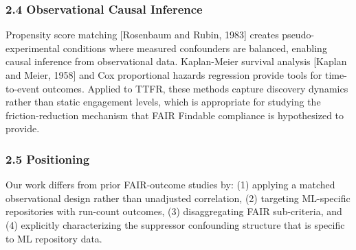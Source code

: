 \subsubsection{2.4 Observational Causal Inference}

Propensity score matching [Rosenbaum and Rubin, 1983] creates pseudo-experimental conditions where measured confounders are balanced, enabling causal inference from observational data. Kaplan-Meier survival analysis [Kaplan and Meier, 1958] and Cox proportional hazards regression \citep{Cox1972} provide tools for time-to-event outcomes. Applied to TTFR, these methods capture discovery dynamics rather than static engagement levels, which is appropriate for studying the friction-reduction mechanism that FAIR Findable compliance is hypothesized to provide.

\subsubsection{2.5 Positioning}

Our work differs from prior FAIR-outcome studies by: (1) applying a matched observational design rather than unadjusted correlation, (2) targeting ML-specific repositories with run-count outcomes, (3) disaggregating FAIR sub-criteria, and (4) explicitly characterizing the suppressor confounding structure that is specific to ML repository data.

